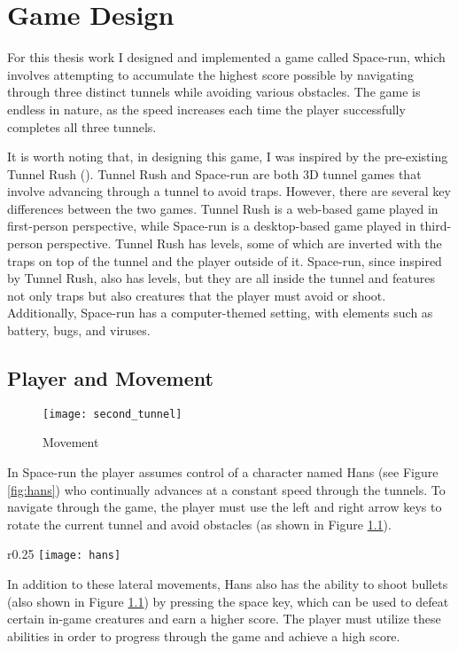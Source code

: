 \chapter{Game Design}
For this thesis work I designed and implemented a game called Space-run, which involves attempting to accumulate the highest score possible by navigating through three distinct tunnels while avoiding various obstacles. The game is endless in nature, as the speed increases each time the player successfully completes all three tunnels. 

It is worth noting that, in designing this game, I was inspired by the pre-existing Tunnel Rush (\cite{tunnelrush}). Tunnel Rush and Space-run are both 3D tunnel games that involve advancing through a tunnel to avoid traps. However, there are several key differences between the two games. Tunnel Rush is a web-based game played in first-person perspective, while Space-run is a desktop-based game played in third-person perspective. Tunnel Rush has levels, some of which are inverted with the traps on top of the tunnel and the player outside of it. Space-run, since inspired by Tunnel Rush, also has levels, but they are all inside the tunnel and features not only traps but also creatures that the player must avoid or shoot. Additionally, Space-run has a computer-themed setting, with elements such as battery, bugs, and viruses.

\section{Player and Movement}

\begin{figure}[h]
    \centering
    \texttt{[image: second\_tunnel]}
    \caption{Movement}
    \label{fig:snd_tunnel}
\end{figure}

In Space-run the player assumes control of a character named Hans (see Figure \ref{fig:hans}) who continually advances at a constant speed through the tunnels. To navigate through the game, the player must use the left and right arrow keys to rotate the current tunnel and avoid obstacles (as shown in Figure \ref{fig:snd_tunnel}). 
\begin{wrapfigure}{r}{0.25\textwidth}
    \centering
    \texttt{[image: hans]}
    \caption{Hans}
    \label{fig:hans}
\end{wrapfigure}
In addition to these lateral movements, Hans also has the ability to shoot bullets (also shown in Figure \ref{fig:snd_tunnel}) by pressing the space key, which can be used to defeat certain in-game creatures and earn a higher score. The player must utilize these abilities in order to progress through the game and achieve a high score.

